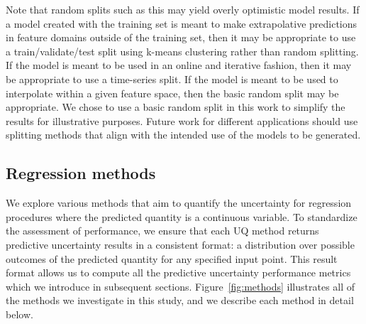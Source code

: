 \documentclass[]{achemso}
\begin{document}
Note that random splits such as this may yield overly optimistic model results.
If a model created with the training set is meant to make extrapolative predictions in feature domains outside of the training set, then it may be appropriate to use a train/validate/test split using k-means clustering\cite{Meredig2018} rather than random splitting.
If the model is meant to be used in an online and iterative fashion, then it may be appropriate to use a time-series split\cite{Hyndman2014}.
If the model is meant to be used to interpolate within a given feature space, then the basic random split may be appropriate.
We chose to use a basic random split in this work to simplify the results for illustrative purposes.
Future work for different applications should use splitting methods that align with the intended use of the models to be generated.


\subsection{Regression methods}

We explore various methods that aim to quantify the uncertainty for regression procedures where the predicted quantity is a continuous variable.
To standardize the assessment of performance, we ensure that each \gls{UQ} method returns predictive uncertainty results in a consistent format:  a distribution over possible outcomes of the predicted quantity for any specified input point.
This result format allows us to compute all the predictive uncertainty performance metrics which we introduce in subsequent sections.
Figure~\ref{fig:methods} illustrates all of the methods we investigate in this study, and we describe each method in detail below.
\end{document}
